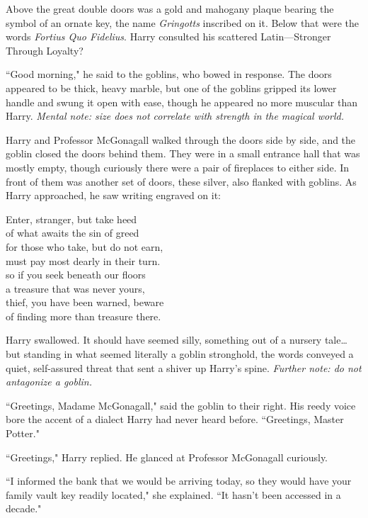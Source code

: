 Above the great double doors was a gold and mahogany plaque bearing the symbol of an ornate key, the name \emph{Gringotts} inscribed on it. Below that were the words \emph{Fortius Quo Fidelius}. Harry consulted his scattered Latin---Stronger Through Loyalty?

``Good morning," he said to the goblins, who bowed in response. The doors appeared to be thick, heavy marble, but one of the goblins gripped its lower handle and swung it open with ease, though he appeared no more muscular than Harry. \emph{Mental note: size does not correlate with strength in the magical world.}

Harry and Professor McGonagall walked through the doors side by side, and the goblin closed the doors behind them. They were in a small entrance hall that was mostly empty, though curiously there were a pair of fireplaces to either side. In front of them was another set of doors, these silver, also flanked with goblins. As Harry approached, he saw writing engraved on it:

\begin{inscription}
Enter, stranger, but take heed\\
of what awaits the sin of greed\\
for those who take, but do not earn,\\
must pay most dearly in their turn.\\
so if you seek beneath our floors\\
a treasure that was never yours,\\
thief, you have been warned, beware\\
of finding more than treasure there.
\end{inscription}

Harry swallowed. It should have seemed silly, something out of a nursery tale{\ldots} but standing in what seemed literally a goblin stronghold, the words conveyed a quiet, self-assured threat that sent a shiver up Harry's spine. \emph{Further note: do not antagonize a goblin.}

``Greetings, Madame McGonagall," said the goblin to their right. His reedy voice bore the accent of a dialect Harry had never heard before. ``Greetings, Master Potter."

``Greetings," Harry replied. He glanced at Professor McGonagall curiously.

``I informed the bank that we would be arriving today, so they would have your family vault key readily located," she explained. ``It hasn't been accessed in a decade."

